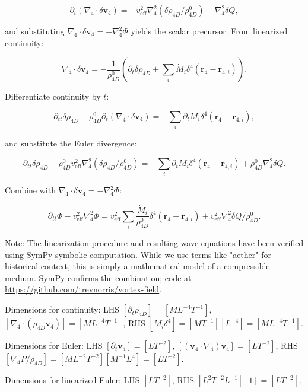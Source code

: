 \begin{equation}
\partial_t (\nabla_4 \cdot \delta \mathbf{v}_4) = -v_{\text{eff}}^2 \nabla_4^2 (\delta \rho_{4D} / \rho_{4D}^0) - \nabla_4^2 \delta Q,
\end{equation}

and substituting $\nabla_4 \cdot \delta \mathbf{v}_4 = -\nabla_4^2 \Phi$ yields the scalar precursor. From linearized continuity:

\begin{equation}
\nabla_4 \cdot \delta \mathbf{v}_4 = -\frac{1}{\rho_{4D}^0} \left( \partial_t \delta \rho_{4D} + \sum_i \dot{M}_i \delta^4(\mathbf{r}_4 - \mathbf{r}_{4,i}) \right).
\end{equation}

Differentiate continuity by $t$:

\begin{equation}
\partial_{tt} \delta \rho_{4D} + \rho_{4D}^0 \partial_t (\nabla_4 \cdot \delta \mathbf{v}_4) = -\sum_i \partial_t \dot{M}_i \delta^4(\mathbf{r}_4 - \mathbf{r}_{4,i}),
\end{equation}

and substitute the Euler divergence:

\begin{equation}
\partial_{tt} \delta \rho_{4D} - \rho_{4D}^0 v_{\text{eff}}^2 \nabla_4^2 (\delta \rho_{4D} / \rho_{4D}^0) = -\sum_i \partial_t \dot{M}_i \delta^4(\mathbf{r}_4 - \mathbf{r}_{4,i}) + \rho_{4D}^0 \nabla_4^2 \delta Q.
\end{equation}

Combine with $\nabla_4 \cdot \delta \mathbf{v}_4 = -\nabla_4^2 \Phi$:

\begin{equation}
\partial_{tt} \Phi - v_{\text{eff}}^2 \nabla_4^2 \Phi = v_{\text{eff}}^2 \sum_i \frac{\dot{M}_i}{\rho_{4D}^0} \delta^4(\mathbf{r}_4 - \mathbf{r}_{4,i}) + v_{\text{eff}}^2 \nabla_4^2 \delta Q / \rho_{4D}^0.
\end{equation}

Note: The linearization procedure and resulting wave equations have been verified using SymPy symbolic computation. While we use terms like "aether" for historical context, this is simply a mathematical model of a compressible medium. SymPy confirms the combination; code at \url{https://github.com/trevnorris/vortex-field}.

\begin{tcolorbox}[title=Dimensional Checks]
Dimensions for continuity: LHS $[\partial_t \rho_{4D}] = [M L^{-4} T^{-1}]$, $[\nabla_4 \cdot (\rho_{4D} \mathbf{v}_4)] = [M L^{-4} T^{-1}]$, RHS $[\dot{M}_i \delta^4] = [M T^{-1}] [L^{-4}] = [M L^{-4} T^{-1}]$.

Dimensions for Euler: LHS $[\partial_t \mathbf{v}_4] = [L T^{-2}]$, $[(\mathbf{v}_4 \cdot \nabla_4) \mathbf{v}_4] = [L T^{-2}]$, RHS $[\nabla_4 P / \rho_{4D}] = [M L^{-2} T^{-2}] [M^{-1} L^{4}] = [L T^{-2}]$.

Dimensions for linearized Euler: LHS $[L T^{-2}]$, RHS $[L^2 T^{-2} L^{-1}] [1] = [L T^{-2}]$.
\end{tcolorbox}


